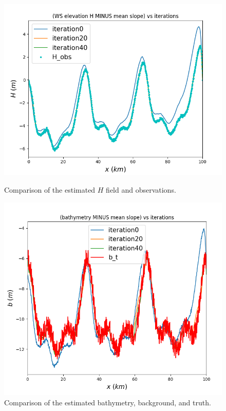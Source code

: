 \documentclass{article}
\begin{document}
\begin{figure}[H]
    \vspace{0.5cm}
    
    \begin{minipage}[b]{0.48\linewidth}
        \centering
        \includegraphics[width=\linewidth]{Images_Ayoub/h_connue/H_Comparaison.png}
        \caption{Comparison of the estimated \( H \) field and observations.}
        \label{fig:hconnue-Hcomparaison}
    \end{minipage}
    \hfill
    \begin{minipage}[b]{0.48\linewidth}
        \centering
        \includegraphics[width=\linewidth]{Images_Ayoub/h_connue/b_Comparaison.png}
        \caption{Comparison of the estimated bathymetry, background, and truth.}
        \label{fig:hconnue-bcomparaison}
    \end{minipage}
    

\end{figure}
\end{document}
